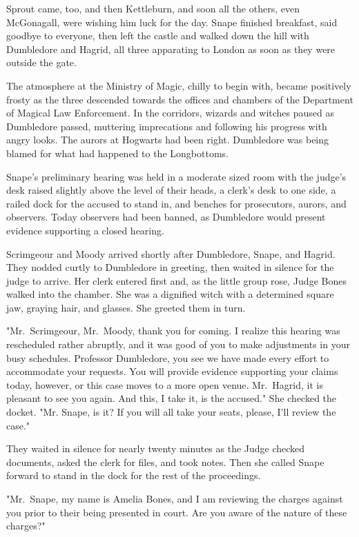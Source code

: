 Sprout came, too, and then Kettleburn, and soon all the others, even McGonagall, were wishing him luck for the day. Snape finished breakfast, said goodbye to everyone, then left the castle and walked down the hill with Dumbledore and Hagrid, all three apparating to London as soon as they were outside the gate.

The atmosphere at the Ministry of Magic, chilly to begin with, became positively frosty as the three descended towards the offices and chambers of the Department of Magical Law Enforcement. In the corridors, wizards and witches paused as Dumbledore passed, muttering imprecations and following his progress with angry looks. The aurors at Hogwarts had been right. Dumbledore was being blamed for what had happened to the Longbottoms.

Snape's preliminary hearing was held in a moderate sized room with the judge's desk raised slightly above the level of their heads, a clerk's desk to one side, a railed dock for the accused to stand in, and benches for prosecutors, aurors, and observers. Today observers had been banned, as Dumbledore would present evidence supporting a closed hearing.

Scrimgeour and Moody arrived shortly after Dumbledore, Snape, and Hagrid. They nodded curtly to Dumbledore in greeting, then waited in silence for the judge to arrive. Her clerk entered first and, as the little group rose, Judge Bones walked into the chamber. She was a dignified witch with a determined square jaw, graying hair, and glasses. She greeted them in turn.

"Mr.~Scrimgeour, Mr.~Moody, thank you for coming. I realize this hearing was rescheduled rather abruptly, and it was good of you to make adjustments in your busy schedules. Professor Dumbledore, you see we have made every effort to accommodate your requests. You will provide evidence supporting your claims today, however, or this case moves to a more open venue. Mr.~Hagrid, it is pleasant to see you again. And this, I take it, is the accused." She checked the docket. "Mr.{\el} Snape, is it? If you will all take your seats, please, I'll review the case."

They waited in silence for nearly twenty minutes as the Judge checked documents, asked the clerk for files, and took notes. Then she called Snape forward to stand in the dock for the rest of the proceedings.

"Mr.~Snape, my name is Amelia Bones, and I am reviewing the charges against you prior to their being presented in court. Are you aware of the nature of these charges?"

